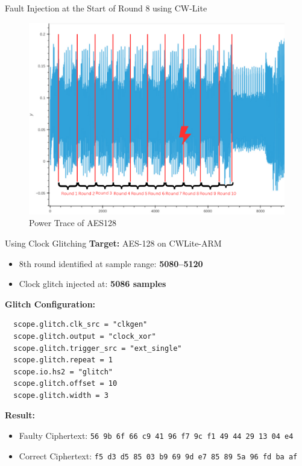 \documentclass{beamer}
\newenvironment{tres important}[2][]{
	\setkeys{EmphEqEnv}{#2}
	\setkeys{EmphEqOpt}{box={\setlength{\fboxsep}{10pt}\fcolorbox{myNewColorA}{white}},#1}
	\EmphEqMainEnv}
{\endEmphEqMainEnv}
\begin{document}
\begin{frame}{Fault Injection at the Start of Round 8 using CW-Lite}
  \begin{figure}
    \centering
    \includegraphics[width=0.7\linewidth]{images/aes128_powertrace.png}
    \caption{Power Trace of AES128}
  \end{figure}
\end{frame}
\begin{frame}[fragile]{Using Clock Glitching}
  \textbf{Target:} AES-128 on CWLite-ARM
  
  \vspace{1mm}
  \begin{itemize}
    \item 8th round identified at sample range: \textbf{5080–5120}
    \item Clock glitch injected at: \textbf{5086 samples}
  \end{itemize}
  
  \textbf{Glitch Configuration:}
  \vspace{1mm}
  
  \begin{lstlisting}
  scope.glitch.clk_src = "clkgen"
  scope.glitch.output = "clock_xor"
  scope.glitch.trigger_src = "ext_single"
  scope.glitch.repeat = 1
  scope.io.hs2 = "glitch"
  scope.glitch.offset = 10
  scope.glitch.width = 3
  \end{lstlisting}
  
  \textbf{Result:}
  \begin{itemize}
    \item Faulty Ciphertext: \texttt{56 9b 6f 66 c9 41 96 f7 9c f1 49 44 29 13 04 e4}
    \item Correct Ciphertext: \texttt{f5 d3 d5 85 03 b9 69 9d e7 85 89 5a 96 fd ba af}
  \end{itemize}
  \end{frame}
\end{document}
